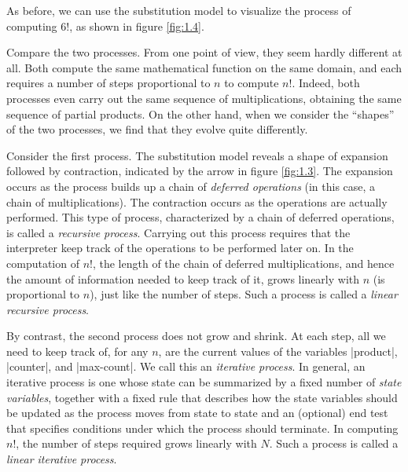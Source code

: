 As before, we can use the substitution model to visualize the process
of computing $6!$, as shown in figure \ref{fig:1.4}.

Compare the two processes.  From one point of view, they seem hardly
different at all.  Both compute the same mathematical function on the
same domain, and each requires a number of steps proportional to $n$
to compute $n!$.  Indeed, both processes even carry out the same
sequence of multiplications, obtaining the same sequence of partial
products.  On the other hand, when we consider the ``shapes'' of the
two processes, we find that they evolve quite differently.

Consider the first process.  The substitution model reveals a shape of
expansion followed by contraction, indicated by the arrow in figure
\ref{fig:1.3}.  The expansion occurs as the process builds up a chain
of \textit{deferred operations} (in this case, a chain of
multiplications).  The contraction occurs as the operations are
actually performed.  This type of process, characterized by a chain of
deferred operations, is called a \textit{recursive process}.  Carrying
out this process requires that the interpreter keep track of the
operations to be performed later on.  In the computation of
$n!$, the length of the chain of deferred multiplications, and
hence the amount of information needed to keep track of it, grows
linearly with $n$ (is proportional to $n$), just like
the number of steps.  Such a process is called a \textit{linear
  recursive process}.

By contrast, the second process does not grow and shrink.  At each
step, all we need to keep track of, for any $n$, are the current
values of the variables \scheme|product|, \scheme|counter|, and
\scheme|max-count|.  We call this an \textit{iterative process}.  In
general, an iterative process is one whose state can be summarized by
a fixed number of \textit{state variables}, together with a fixed rule
that describes how the state variables should be updated as the
process moves from state to state and an (optional) end test that
specifies conditions under which the process should terminate.  In
computing $n!$, the number of steps required grows linearly with $N$.
Such a process is called a \textit{linear iterative process}.

